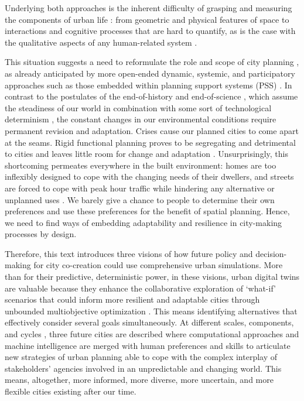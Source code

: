 Underlying both approaches is the inherent difficulty of grasping and measuring the components of urban life \citep{DeNadai2016}: from geometric and physical features of space to interactions and cognitive processes that are hard to quantify, as is the case with the qualitative aspects of any human-related system \citep{Helbing2021}.

This situation suggests a need to reformulate the role and scope of city planning \citep{Cuthbert2006, Ratti2015}, as already anticipated by more open-ended dynamic, systemic, and participatory approaches such as those embedded within planning support systems (PSS) \citep{Geertman2020}. In contrast to the postulates of the end-of-history \citep{Fukuyama1992} and end-of-science \citep{Anderson2008,Carpo2014}, which assume the steadiness of our world in combination with some sort of technological determinism \citep{Lanier2013}, the constant changes in our environmental conditions require permanent revision and adaptation. Crises cause our planned cities to come apart at the seams. Rigid functional planning proves to be segregating and detrimental to cities and leaves little room for change and adaptation \citep{Jacobs1961, Mantysalo2005, Verebes2014}. Unsurprisingly, this shortcoming permeates everywhere in the built environment: homes are too inflexibly designed to cope with the changing needs of their dwellers, and streets are forced to cope with peak hour traffic while hindering any alternative or unplanned uses \citep{Bereitschaft2020, Southworth1997}. We barely give a chance to people to determine their own preferences and use these preferences for the benefit of spatial planning. Hence, we need to find ways of embedding adaptability and resilience in city-making processes by design. 

Therefore, this text introduces three visions of how future policy and decision-making for city co-creation could use comprehensive urban simulations. More than for their predictive, deterministic power, in these visions, urban digital twins \citep{Batty2018AIandSmartCities} are valuable because they enhance the collaborative exploration of ‘what-if’ scenarios \citep{Dembski2020} that could inform more resilient and adaptable cities through unbounded multiobjective optimization \citep{Deb2014}. This means identifying alternatives that effectively consider several goals simultaneously. At different scales, components, and cycles \citep{Gaffron2005}, three future cities are described where computational approaches and machine intelligence are merged with human preferences and skills to articulate new strategies of urban planning able to cope with the complex interplay of stakeholders’ agencies involved \citep{Quan2019} in an unpredictable and changing world. This means, altogether, more informed, more diverse, more uncertain, and more flexible cities existing after our time.

